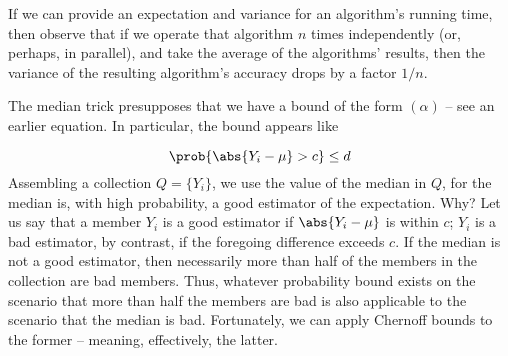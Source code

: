 \documentclass[../main.tex]{subfiles}
\begin{document}
\begin{remark}
    If we can provide an expectation and variance for an algorithm's running time, then observe that if we operate that algorithm $n$ times independently (or, perhaps, in parallel), and take the average of the algorithms' results, then the variance of the resulting algorithm's accuracy drops by a factor $1/n$.
\end{remark}

\begin{remark}
    The median trick presupposes that we have a bound of the form $(\alpha)$ -- see an earlier equation. In particular, the bound appears like
    
    \[
        \prob{\abs{Y_{i} - \mu} > c} \leq d 
    \]
    Assembling a collection $Q = \{Y_{i}\}$, we use the value of the median in $Q$, for the median is, with high probability, a good estimator of the expectation. Why? Let us say that a member $Y_{i}$ is a good estimator if $\abs{Y_{i} - \mu}$ is within $c$; $Y_{i}$ is a bad estimator, by contrast, if the foregoing difference exceeds $c$. If the median is not a good estimator, then necessarily more than half of the members in the collection are bad members. Thus, whatever probability bound exists on the scenario that more than half the members are bad is also applicable to the scenario that the median is bad. Fortunately, we can apply Chernoff bounds to the former -- meaning, effectively, the latter.
\end{remark}
\end{document}
